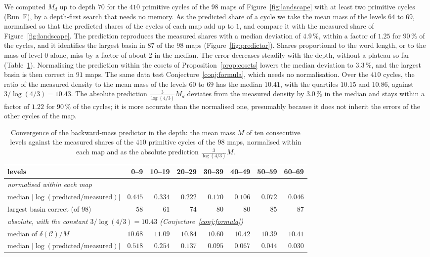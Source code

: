 \documentclass[12pt]{amsart}
\theoremstyle{definition}
\theoremstyle{remark}
\begin{document}
We computed $M_d$ up to depth $70$ for the $410$ primitive cycles of the $98$ maps of Figure~\ref{fig:landscape} with at least two primitive cycles (Run~F), by a depth-first search that needs no memory. As the predicted share of a cycle we take the mean mass of the levels $64$ to $69$, normalised so that the predicted shares of the cycles of each map add up to $1$, and compare it with the measured share of Figure~\ref{fig:landscape}. The prediction reproduces the measured shares with a median deviation of $4.9\,\%$, within a factor of $1.25$ for $90\,\%$ of the cycles, and it identifies the largest basin in $87$ of the $98$ maps (Figure~\ref{fig:predictor}). Shares proportional to the word length, or to the mass of level $0$ alone, miss by a factor of about $2$ in the median. The error decreases steadily with the depth, without a plateau so far (Table~\ref{table:convergence}). Normalising the prediction within the cosets of Proposition~\ref{prop:cosets} lowers the median deviation to $3.3\,\%$, and the largest basin is then correct in $91$ maps. The same data test Conjecture~\ref{conj:formula}, which needs no normalisation. Over the $410$ cycles, the ratio of the measured density to the mean mass of the levels $60$ to $69$ has the median $10.41$, with the quartiles $10.15$ and $10.86$, against $3/\log(4/3)=10.43$. The absolute prediction $\tfrac{3}{\log(4/3)}M_d$ deviates from the measured density by $3.0\,\%$ in the median and stays within a factor of $1.22$ for $90\,\%$ of the cycles; it is more accurate than the normalised one, presumably because it does not inherit the errors of the other cycles of the map.

\begin{table}[htbp]
\centering
\small
\begin{tabular}{lrrrrrrr}
\toprule
levels & 0--9 & 10--19 & 20--29 & 30--39 & 40--49 & 50--59 & 60--69 \\
\midrule
\multicolumn{8}{l}{\emph{normalised within each map}} \\
median $\lvert\log(\text{predicted}/\text{measured})\rvert$ & $0.445$ & $0.334$ & $0.222$ & $0.170$ & $0.106$ & $0.072$ & $0.046$ \\
largest basin correct (of $98$) & $58$ & $61$ & $74$ & $80$ & $80$ & $85$ & $87$ \\
\midrule
\multicolumn{8}{l}{\emph{absolute, with the constant $3/\log(4/3)=10.43$ (Conjecture~\ref{conj:formula})}} \\
median of $\delta(\mathcal C)/M$ & $10.68$ & $11.09$ & $10.84$ & $10.60$ & $10.42$ & $10.39$ & $10.41$ \\
median $\lvert\log(\text{predicted}/\text{measured})\rvert$ & $0.518$ & $0.254$ & $0.137$ & $0.095$ & $0.067$ & $0.044$ & $0.030$ \\
\bottomrule
\end{tabular}
\caption{Convergence of the backward-mass predictor in the depth: the mean mass $M$ of ten consecutive levels against the measured shares of the $410$ primitive cycles of the $98$ maps, normalised within each map and as the absolute prediction $\tfrac{3}{\log(4/3)}M$.}
\label{table:convergence}
\end{table}
\end{document}
